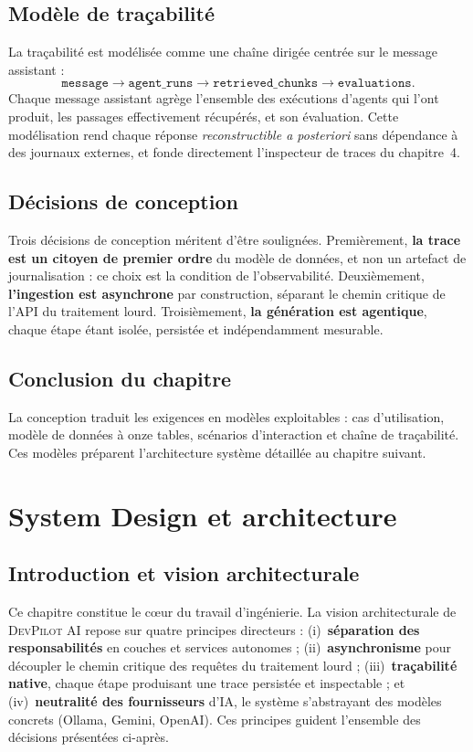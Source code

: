\documentclass[12pt,a4paper,oneside]{report}
\newcommand{\devpilot}{\textsc{DevPilot AI}}
\begin{document}
\section{Modèle de traçabilité}
La traçabilité est modélisée comme une chaîne dirigée centrée sur le message
assistant : \[\texttt{message} \rightarrow \texttt{agent\_runs} \rightarrow
\texttt{retrieved\_chunks} \rightarrow \texttt{evaluations}.\] Chaque message
assistant agrège l'ensemble des exécutions d'agents qui l'ont produit, les
passages effectivement récupérés, et son évaluation. Cette modélisation rend
chaque réponse \emph{reconstructible a posteriori} sans dépendance à des journaux
externes, et fonde directement l'inspecteur de traces du chapitre~4.

\section{Décisions de conception}
Trois décisions de conception méritent d'être soulignées. Premièrement,
\textbf{la trace est un citoyen de premier ordre} du modèle de données, et non un
artefact de journalisation : ce choix est la condition de l'observabilité.
Deuxièmement, \textbf{l'ingestion est asynchrone} par construction, séparant le
chemin critique de l'API du traitement lourd. Troisièmement,
\textbf{la génération est agentique}, chaque étape étant isolée, persistée et
indépendamment mesurable.

\section{Conclusion du chapitre}
La conception traduit les exigences en modèles exploitables : cas d'utilisation,
modèle de données à onze tables, scénarios d'interaction et chaîne de traçabilité.
Ces modèles préparent l'architecture système détaillée au chapitre suivant.

\chapter{System Design et architecture}
\label{chap:archi}

\section{Introduction et vision architecturale}
Ce chapitre constitue le c{\oe}ur du travail d'ingénierie. La vision
architecturale de \devpilot{} repose sur quatre principes directeurs :
(i)~\textbf{séparation des responsabilités} en couches et services autonomes ;
(ii)~\textbf{asynchronisme} pour découpler le chemin critique des requêtes du
traitement lourd ; (iii)~\textbf{traçabilité native}, chaque étape produisant une
trace persistée et inspectable ; et (iv)~\textbf{neutralité des fournisseurs}
d'IA, le système s'abstrayant des modèles concrets (Ollama, Gemini, OpenAI). Ces
principes guident l'ensemble des décisions présentées ci-après.
\end{document}
